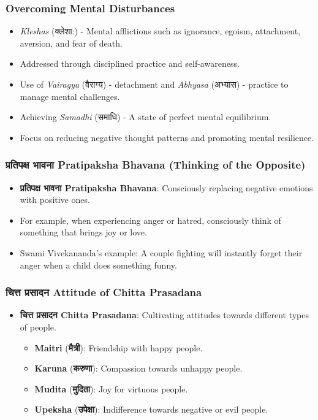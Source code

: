 \begin{frame}[fragile]\frametitle{Overcoming Mental Disturbances}

      \begin{itemize}
		\item \textit{Kleshas} (क्लेशा:) - Mental afflictions such as ignorance, egoism, attachment, aversion, and fear of death.
		\item Addressed through disciplined practice and self-awareness.
		\item Use of \textit{Vairagya} (वैराग्य) - detachment and \textit{Abhyasa} (अभ्यास) - practice to manage mental challenges.
		\item Achieving \textit{Samadhi} (समाधि) - A state of perfect mental equilibrium.
		\item Focus on reducing negative thought patterns and promoting mental resilience.
	  \end{itemize}

\end{frame}


\begin{frame}[fragile]\frametitle{प्रतिपक्ष भावना  Pratipaksha Bhavana (Thinking of the Opposite)}
    \begin{itemize}
        \item \textbf{प्रतिपक्ष भावना  Pratipaksha Bhavana}: Consciously replacing negative emotions with positive ones.
        \item For example, when experiencing anger or hatred, consciously think of something that brings joy or love.
        \item Swami Vivekananda’s example: A couple fighting will instantly forget their anger when a child does something funny.
    \end{itemize}
\end{frame}

\begin{frame}[fragile]\frametitle{चित्त प्रसादन  Attitude of Chitta Prasadana}
    \begin{itemize}
        \item \textbf{चित्त प्रसादन  Chitta Prasadana}: Cultivating attitudes towards different types of people.
        \begin{itemize}
            \item \textbf{Maitri} (\textbf{मैत्री}): Friendship with happy people.
            \item \textbf{Karuna} (\textbf{करुणा}): Compassion towards unhappy people.
            \item \textbf{Mudita} (\textbf{मुदिता}): Joy for virtuous people.
            \item \textbf{Upeksha} (\textbf{उपेक्षा}): Indifference towards negative or evil people.
        \end{itemize}
    \end{itemize}
\end{frame}

